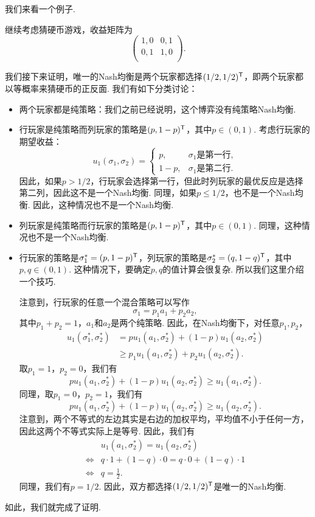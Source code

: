 我们来看一个例子. 
\begin{example}[猜硬币游戏的Nash均衡]
继续考虑猜硬币游戏，收益矩阵为
\[
\begin{pmatrix}
1,0&0,1\\
0,1&1,0\\
\end{pmatrix}.
\]

我们接下来证明，唯一的Nash均衡是两个玩家都选择$(1/2,1/2)^{\mathsf{T}}$，即两个玩家都以等概率来猜硬币的正反面. 我们有如下分类讨论：
\begin{itemize}
    \item 两个玩家都是纯策略：我们之前已经说明，这个博弈没有纯策略Nash均衡. 
    \item 行玩家是纯策略而列玩家的策略是$(p,1-p)^{\mathsf{T}}$，其中$p\in(0,1)$. 考虑行玩家的期望收益：
    \[
        u_1(\sigma_1,\sigma_2)=\begin{cases}
            p,&\text{$\sigma_1$是第一行},\\
            1-p,&\text{$\sigma_1$是第二行}.
        \end{cases}
    \]
    因此，如果$p>1/2$，行玩家会选择第一行，但此时列玩家的最优反应是选择第二列，因此这不是一个Nash均衡. 同理，如果$p\leq 1/2$，也不是一个Nash均衡. 因此，这种情况也不是一个Nash均衡.
    \item 列玩家是纯策略而行玩家的策略是$(p,1-p)^{\mathsf{T}}$，其中$p\in(0,1)$. 同理，这种情况也不是一个Nash均衡.
    \item 行玩家的策略是$\sigma_1^*=(p,1-p)^{\mathsf{T}}$，列玩家的策略是$\sigma_2^*=(q,1-q)^{\mathsf{T}}$，其中$p,q\in(0,1)$. 这种情况下，要确定$p,q$的值计算会很复杂. 所以我们这里介绍一个技巧. 
    
    注意到，行玩家的任意一个混合策略可以写作
    \[\sigma_1=p_1a_1+p_2a_2,\]
    其中$p_1+p_2=1$，$a_1$和$a_2$是两个纯策略. 因此，在Nash均衡下，对任意$p_1,p_2$，
    \[
    \begin{aligned}
        u_1(\sigma_1^*,\sigma_2^*)&=pu_1(a_1,\sigma_2^*)+(1-p)u_1(a_2,\sigma_2^*)\\
        &\geq p_1u_1(a_1,\sigma_2^*)+p_2u_1(a_2,\sigma_2^*).
    \end{aligned}
    \]
    取$p_1=1$，$p_2=0$，我们有
    \[pu_1(a_1,\sigma_2^*)+(1-p)u_1(a_2,\sigma_2^*)\geq u_1(a_1,\sigma_2^*).\]
    同理，取$p_1=0$，$p_2=1$，我们有
    \[pu_1(a_1,\sigma_2^*)+(1-p)u_1(a_2,\sigma_2^*)\geq u_1(a_2,\sigma_2^*).\]
    注意到，两个不等式的左边其实是右边的加权平均，平均值不小于任何一方，因此这两个不等式实际上是等号. 因此，我们有
    \begin{align*}
        &u_1(a_1,\sigma_2^*)=u_1(a_2,\sigma_2^*)\\
        \iff& q\cdot 1+(1-q)\cdot 0=q\cdot 0+(1-q)\cdot 1\\
        \iff& q=\frac{1}{2}.
    \end{align*}
    同理，我们有$p=1/2$. 因此，双方都选择$(1/2,1/2)^{\mathsf{T}}$是唯一的Nash均衡.
\end{itemize}
如此，我们就完成了证明.
\end{example}

